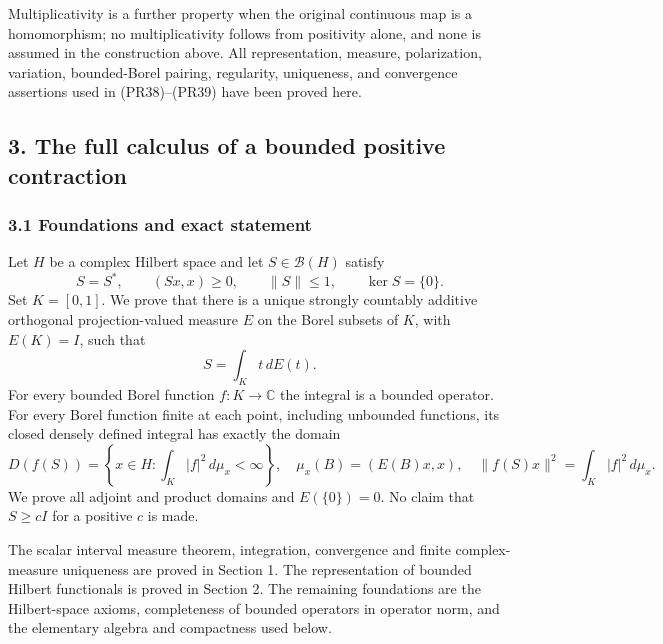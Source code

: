 \documentclass[
  11pt,
]{article}
\begin{document}
Multiplicativity is a further property when the original continuous map
is a homomorphism; no multiplicativity follows from positivity alone,
and none is assumed in the construction above. All representation,
measure, polarization, variation, bounded-Borel pairing, regularity,
uniqueness, and convergence assertions used in (PR38)--(PR39) have been
proved here.

\subsection{3. The full calculus of a bounded positive
contraction}\label{the-full-calculus-of-a-bounded-positive-contraction}

\subsubsection{3.1 Foundations and exact
statement}\label{foundations-and-exact-statement}

Let \(H\) be a complex Hilbert space and let \(S\in\mathcal B(H)\)
satisfy \[
 S=S^*,\qquad (Sx,x)\geq0,\qquad\|S\|\leq1,
 \qquad\ker S=\{0\}.
 \tag{BS1}
\] Set \(K=[0,1]\). We prove that there is a unique strongly countably
additive orthogonal projection-valued measure \(E\) on the Borel subsets
of \(K\), with \(E(K)=I\), such that \[
 S=\int_K t\,dE(t).
 \tag{BS2}
\] For every bounded Borel function \(f:K\to\mathbb C\) the integral is
a bounded operator. For every Borel function finite at each point,
including unbounded functions, its closed densely defined integral has
exactly the domain \[
 D(f(S))=\left\{x\in H:\int_K|f|^2\,d\mu_x<\infty\right\},
 \quad\mu_x(B)=(E(B)x,x),
 \quad\|f(S)x\|^2=\int_K|f|^2\,d\mu_x.
 \tag{BS3}
\] We prove all adjoint and product domains and \(E(\{0\})=0\). No claim
that \(S\geq cI\) for a positive \(c\) is made.

The scalar interval measure theorem, integration, convergence and finite
complex-measure uniqueness are proved in Section 1. The representation
of bounded Hilbert functionals is proved in Section 2. The remaining
foundations are the Hilbert-space axioms, completeness of bounded
operators in operator norm, and the elementary algebra and compactness
used below.
\end{document}
